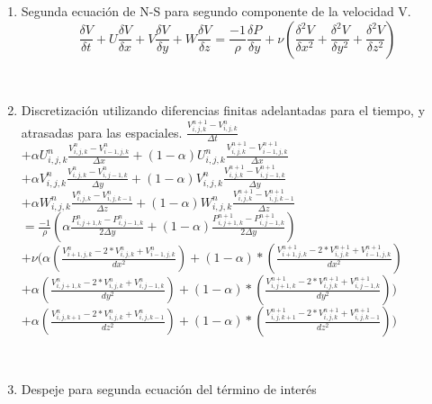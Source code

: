 \documentclass[a4paper]{article}
\begin{document}
\begin{enumerate}

\item Segunda ecuación de N-S para segundo componente de la velocidad V.
$$ \frac{\delta V}{\delta t} + U \frac{\delta V}{\delta x} + V \frac{\delta V}{\delta y} + W \frac{\delta V}{\delta z} =  \frac{-1}{\rho} \frac{\delta P}{\delta y} + \nu (\frac{{\delta}^{2} V}{\delta {x}^{2}} + \frac{{\delta}^{2} V}{\delta {y}^{2}} + \frac{{\delta}^{2} V}{\delta {z}^{2}}) $$

~\\

\item Discretización utilizando diferencias finitas adelantadas para el tiempo, y atrasadas para las espaciales.
$ \frac{ {V}^{n+1}_{i,j,k} - V^{n}_{i,j,k}}{ \Delta t} $
$+ \alpha {U}^{n}_{i,j,k} \frac{ {V}^{n}_{i,j,k} - V^{n}_{i-1,j,k}}{\Delta x} + (1 - \alpha) {U}^{n}_{i,j,k} \frac{ {V}^{n+1}_{i,j,k} - V^{n+1}_{i-1,j,k}}{ \Delta x}$ 
\\
$+ \alpha {V}^{n}_{i,j,k} \frac{ {V}^{n}_{i,j,k} - V^{n}_{i,j-1,k}}{ \Delta y} + (1 - \alpha) {V}^{n}_{i,j,k} \frac{ {V}^{n+1}_{i,j,k} - V^{n+1}_{i,j-1,k}}{ \Delta y}$
\\
$+ \alpha {W}^{n}_{i,j,k} \frac{ {V}^{n}_{i,j,k} - V^{n}_{i,j,k-1}}{ \Delta z} + (1 - \alpha) {W}^{n}_{i,j,k} \frac{ {V}^{n+1}_{i,j,k} - V^{n+1}_{i,j,k-1}}{ \Delta z}$
\\
$= \frac{-1}{\rho} ( \alpha \frac{P^{n}_{i,j+1,k} - P^{n}_{i,j-1,k} }{ 2 \Delta y } + (1 - \alpha) \frac{P^{n+1}_{i,j+1,k} - P^{n+1}_{i,j-1,k} }{ 2 \Delta y })  $
\\
$+ \nu (\alpha (\frac{ V^{n}_{i+1,j,k} - 2*V^{n}_{i,j,k} + V^{n}_{i-1,j,k}}{dx^2}) + (1-\alpha)*(\frac{ V^{n+1}_{i+1,j,k} - 2*V^{n+1}_{i,j,k} + V^{n+1}_{i-1,j,k}}{dx^2})$
\\
$+ \alpha (\frac{ V^{n}_{i,j+1,k} - 2*V^{n}_{i,j,k} + V^{n}_{i,j-1,k}}{dy^2}) + (1-\alpha)*(\frac{ V^{n+1}_{i,j+1,k} - 2*V^{n+1}_{i,j,k} + V^{n+1}_{i,j-1,k}}{dy^2}))$
\\
$+ \alpha (\frac{ V^{n}_{i,j,k+1} - 2*V^{n}_{i,j,k} + V^{n}_{i,j,k-1}}{dz^2}) + (1-\alpha)*(\frac{ V^{n+1}_{i,j,k+1} - 2*V^{n+1}_{i,j,k} + V^{n+1}_{i,j,k-1}}{dz^2}))$

~\\

\item Despeje para segunda ecuación del término de interés


\end{enumerate}
\end{document}
